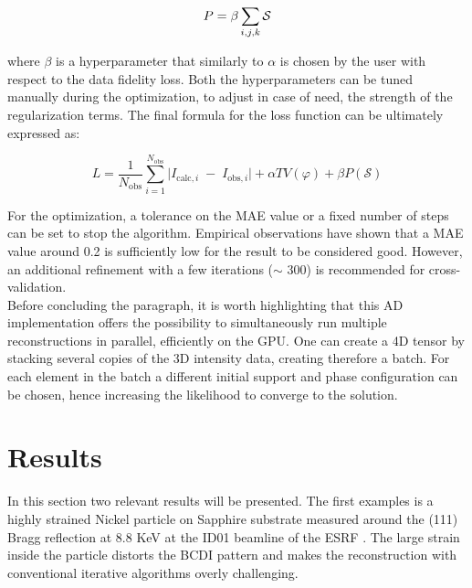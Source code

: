 \begin{equation}
    \centering
    P = \beta  \sum_{i,j,k} \mathcal S
\end{equation}

where $\beta$ is a hyperparameter that similarly to $\alpha$ is chosen by the user with respect to the data fidelity loss. 
Both the hyperparameters can be tuned manually during the optimization, to adjust in case of need, the strength of 
the regularization terms. 
The final formula for the loss function can be ultimately expressed as: 

\begin{equation}
       L = \frac{1}{N_{\mathrm{obs}}}
       \sum_{i=1}^{N_{\mathrm{obs}}}
       \bigl\lvert I_{\mathrm{calc},i} \;-\; I_{\mathrm{obs},i}\bigr\rvert  
        + \alpha TV(\varphi)
        + \beta  P(\mathcal S)
\end{equation}

For the optimization, a tolerance on the MAE value or a fixed number of steps can be set to stop the algorithm. Empirical 
observations have shown that a MAE value around 0.2 is sufficiently low for the result to be considered good. However, 
an additional refinement with a few iterations ($\sim$ 300) is recommended for cross-validation.  \\

Before concluding the paragraph, it is worth highlighting that this AD implementation offers the possibility to simultaneously 
run multiple reconstructions in parallel, efficiently on the GPU. One can create a 4D tensor by stacking several copies of the 3D 
intensity data, creating therefore a batch. For each element in the batch a different initial support and phase configuration 
can be chosen, hence increasing the likelihood to converge to the solution. 

\section{Results}
In this section two relevant results will be presented. The first examples is a highly strained Nickel particle on 
Sapphire substrate measured around the (111) Bragg reflection at 8.8 KeV at the ID01 beamline of the ESRF \cite{Bellec2027Bragg}. 
The large strain inside the particle distorts the BCDI pattern and makes the reconstruction with conventional iterative 
algorithms overly challenging. 

